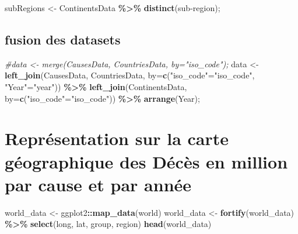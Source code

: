 \documentclass[
]{article}
\newenvironment{Shaded}{\begin{snugshade}}{\end{snugshade}}
\newcommand{\AttributeTok}[1]{\textcolor[rgb]{0.13,0.29,0.53}{#1}}
\newcommand{\CommentTok}[1]{\textcolor[rgb]{0.56,0.35,0.01}{\textit{#1}}}
\newcommand{\FunctionTok}[1]{\textcolor[rgb]{0.13,0.29,0.53}{\textbf{#1}}}
\newcommand{\NormalTok}[1]{#1}
\newcommand{\OtherTok}[1]{\textcolor[rgb]{0.56,0.35,0.01}{#1}}
\newcommand{\SpecialCharTok}[1]{\textcolor[rgb]{0.81,0.36,0.00}{\textbf{#1}}}
\newcommand{\StringTok}[1]{\textcolor[rgb]{0.31,0.60,0.02}{#1}}
\begin{document}
\begin{Shaded}
\begin{Highlighting}[]
\NormalTok{subRegions }\OtherTok{\textless{}{-}}\NormalTok{ ContinentsData }\SpecialCharTok{\%\textgreater{}\%} \FunctionTok{distinct}\NormalTok{(}\StringTok{\textasciigrave{}}\AttributeTok{sub{-}region}\StringTok{\textasciigrave{}}\NormalTok{);}
\end{Highlighting}
\end{Shaded}

\hypertarget{fusion-des-datasets}{%
\subsection{fusion des datasets}\label{fusion-des-datasets}}

\begin{Shaded}
\begin{Highlighting}[]
\CommentTok{\#data \textless{}{-} merge(CausesData, CountriesData, by="iso\_code");}
\NormalTok{data }\OtherTok{\textless{}{-}} \FunctionTok{left\_join}\NormalTok{(CausesData, CountriesData, }\AttributeTok{by=}\FunctionTok{c}\NormalTok{(}\StringTok{"iso\_code"}\OtherTok{=}\StringTok{"iso\_code"}\NormalTok{, }\StringTok{"Year"}\OtherTok{=}\StringTok{"year"}\NormalTok{)) }\SpecialCharTok{\%\textgreater{}\%}
  \FunctionTok{left\_join}\NormalTok{(ContinentsData, }\AttributeTok{by=}\FunctionTok{c}\NormalTok{(}\StringTok{"iso\_code"}\OtherTok{=}\StringTok{"iso\_code"}\NormalTok{)) }\SpecialCharTok{\%\textgreater{}\%}
  \FunctionTok{arrange}\NormalTok{(Year);}
\end{Highlighting}
\end{Shaded}

\hypertarget{repruxe9sentation-sur-la-carte-guxe9ographique-des-duxe9cuxe8s-en-million-par-cause-et-par-annuxe9e}{%
\section{Représentation sur la carte géographique des Décès en million
par cause et par
année}\label{repruxe9sentation-sur-la-carte-guxe9ographique-des-duxe9cuxe8s-en-million-par-cause-et-par-annuxe9e}}

\begin{Shaded}
\begin{Highlighting}[]
\NormalTok{world\_data }\OtherTok{\textless{}{-}}\NormalTok{ ggplot2}\SpecialCharTok{::}\FunctionTok{map\_data}\NormalTok{(}\StringTok{\textquotesingle{}world\textquotesingle{}}\NormalTok{)}
\NormalTok{world\_data }\OtherTok{\textless{}{-}} \FunctionTok{fortify}\NormalTok{(world\_data) }\SpecialCharTok{\%\textgreater{}\%} \FunctionTok{select}\NormalTok{(long, lat, group, region)}
\FunctionTok{head}\NormalTok{(world\_data)}
\end{Highlighting}
\end{Shaded}
\end{document}
